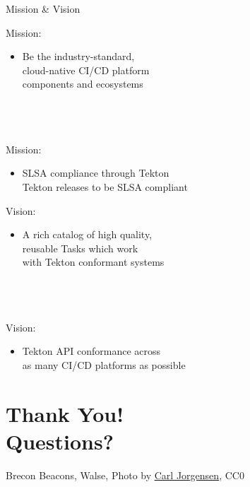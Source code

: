\documentclass[aspectratio=169,11pt,hyperref={colorlinks=true}]{beamer}
\begin{document}
\begin{2columnsframe}{Mission \& Vision}%
  {%
  Mission:
  \begin{itemize}
    \item Be the industry-standard,\\
          cloud-native CI/CD platform \\
          components and ecosystems \\
  \end{itemize}
  ~\\
  ~\\
  \tiny~\\
  \normalsize
  Mission:
  \begin{itemize}
    \item SLSA compliance through Tekton \\
          Tekton releases to be SLSA compliant
  \end{itemize}
  }{%
  Vision:
  \begin{itemize}
    \item A rich catalog of high quality,\\
          reusable Tasks which work\\
          with Tekton conformant systems\\
  \end{itemize}
  ~\\
  ~\\
  \tiny~\\
  \normalsize
  Vision:
  \begin{itemize}
    \item Tekton API conformance across\\
          as many CI/CD platforms as possible
  \end{itemize}
  }
\end{2columnsframe}

\section[Q\&A]{Thank You! \\Questions?}

\begin{sectionwithpiclargecentral}{Brecon Beacons, Walse, Photo by \href{https://unsplash.com/@scamartist}{\underline{Carl Jorgensen}}, CC0}
\end{sectionwithpiclargecentral}
\end{document}
